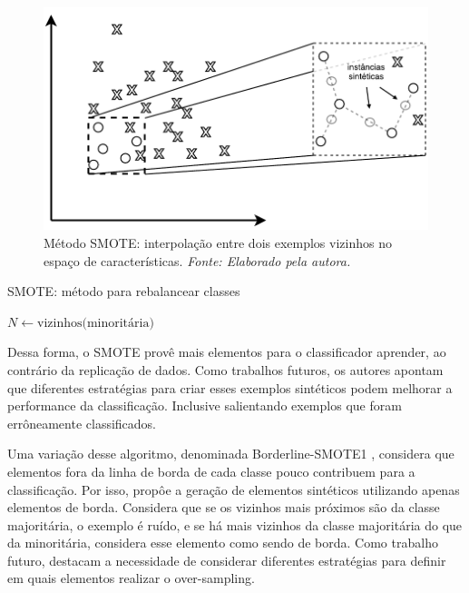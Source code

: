 \begin{figure}[!htbp]
  \begin{center}
    \includegraphics[scale=1]{figuras/smote.pdf}
  \end{center}
  \caption[Método SMOTE: interpolação entre dois exemplos vizinhos no espaço de características.]{Método SMOTE: interpolação entre dois exemplos vizinhos no espaço de características. \textit{Fonte: Elaborado pela autora.}}
  \label{fig:smote}
\end{figure}

\begin{algorithm}[!htbp]
  \caption{SMOTE: método para rebalancear classes}
  \label{alg:smote}
  \SetAlgoLined
  $N \gets \text{vizinhos(minoritária)}$\;
\end{algorithm}

Dessa forma, o SMOTE provê mais elementos para o classificador aprender, ao contrário da replicação de dados. Como trabalhos futuros, os autores  apontam que diferentes estratégias para criar esses exemplos sintéticos podem melhorar a performance da classificação. Inclusive salientando exemplos que foram errôneamente classificados.

Uma variação desse algoritmo, denominada Borderline-SMOTE1 \cite{Han2005}, considera que elementos fora da linha de borda de cada classe pouco contribuem para a classificação. Por isso, propôe a geração de elementos sintéticos utilizando apenas elementos de borda. Considera que se os vizinhos mais próximos são da classe majoritária, o exemplo é ruído, e se há mais vizinhos da classe majoritária do que da minoritária, considera esse elemento como sendo de borda. Como trabalho futuro, destacam a necessidade de considerar diferentes estratégias para definir em quais elementos realizar o over-sampling.


